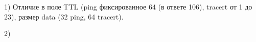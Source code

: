 \documentclass[a4paper,11pt]{article}
\begin{document}
\begin{center}
\label{fig:image}
\end{center}
1) Отличие в поле TTL (ping фиксированное 64 (в ответе 106), tracert от 1 до 23), размер data (32 ping, 64 tracert).

2)
\begin{center}
\label{fig:image}
\end{center}
\end{document}
